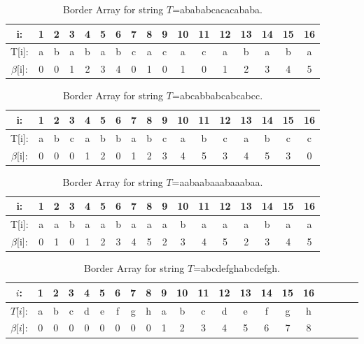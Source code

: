 \begin{table}[h]
  \footnotesize
  \begin{tabular}{c|cccccccccccccccc}
    i: & 1 & 2 & 3 & 4 & 5 & 6 & 7 & 8 & 9 & 10 & 11 & 12 & 13 & 14 & 15 & 16\\
    \hline
    T[i]: & a & b & a & b & a & b & c & a & c & a & c & a & b & a & b & a\\
    \hline
    $\beta$[i]: & 0 & 0 & 1 & 2 & 3 & 4 & 0 & 1 & 0 & 1 & 0 & 1 & 2 & 3 & 4 & 5
  \end{tabular}
  \caption{Border Array for string $T$=abababcacacababa.}
\end{table}

\begin{table}
  \footnotesize
  \begin{tabular}{c|cccccccccccccccc}
    i: & 1 & 2 & 3 & 4 & 5 & 6 & 7 & 8 & 9 & 10 & 11 & 12 & 13 & 14 & 15 & 16\\
    \hline
    T[i]: & a & b & c & a & b & b & a & b & c & a & b & c & a & b & c & c\\
    \hline
    $\beta$[i]: & 0 & 0 & 0 & 1 & 2 & 0 & 1 & 2 & 3 & 4 & 5 & 3 & 4 & 5 & 3 & 0
  \end{tabular}
  \caption{Border Array for string $T$=abcabbabcabcabcc.}
\end{table}

\begin{table}[h]
  \footnotesize
  \begin{tabular}{c|cccccccccccccccc}
    i: & 1 & 2 & 3 & 4 & 5 & 6 & 7 & 8 & 9 & 10 & 11 & 12 & 13 & 14 & 15 & 16\\
    \hline
    T[i]: & a & a & b & a & a & b & a & a & a & b & a & a & a & b & a & a\\
    \hline
    $\beta$[i]: & 0 & 1 & 0 & 1 & 2 & 3 & 4 & 5 & 2 & 3 & 4 & 5 & 2 & 3 & 4 & 5
  \end{tabular}
  \caption{Border Array for string $T$=aabaabaaabaaabaa.}
\end{table}

\begin{table}[h]
  \footnotesize
  \begin{tabular}{c|cccccccccccccccccccc}
    $i$: & 1 & 2 & 3 & 4 & 5 & 6 & 7 & 8 & 9 & 10 & 11 & 12 & 13 & 14 & 15 & 16\\
    \hline
    $T$[$i$]: & a & b & c & d & e & f & g & h & a & b & c & d & e & f & g & h\\
    \hline
    $\beta$[$i$]: & 0 & 0 & 0 & 0 & 0 & 0 & 0 & 0 & 1 & 2 & 3 & 4 & 5 & 6 & 7 & 8
  \end{tabular}
  \caption{Border Array for string $T$=abcdefghabcdefgh.}
\end{table}

